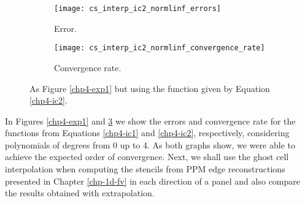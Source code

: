 \begin{figure}[!htb]
	\centering
	\begin{subfigure}{0.45\textwidth}
		\centering
		\texttt{[image: cs\_interp\_ic2\_normlinf\_errors]}
		\caption{Error.\label{chp4-exp2-error}}
	\end{subfigure}
	\begin{subfigure}{0.45\textwidth}
		\centering
		\texttt{[image: cs\_interp\_ic2\_normlinf\_convergence\_rate]}
		\caption{Convergence rate.\label{chp4-exp2-CR}}
	\end{subfigure}
	\caption{As Figure \ref{chp4-exp1} but using the function given by Equation \eqref{chp4-ic2}.\label{chp4-exp2}}
\end{figure}
\break
In Figures \ref{chp4-exp1} and \ref{chp4-exp2} we show the errors and convergence rate for the functions from Equations \eqref{chp4-ic1} and \eqref{chp4-ic2},
respectively, considering polynomials of degrees from 0 up to 4. As both graphs show, we were able to achieve the expected order of convergence.
Next, we shall use the ghost cell interpolation when computing the stencils from PPM edge reconstructions presented in Chapter \ref{chp-1d-fv}
in each direction of a panel and also compare the results obtained with extrapolation.